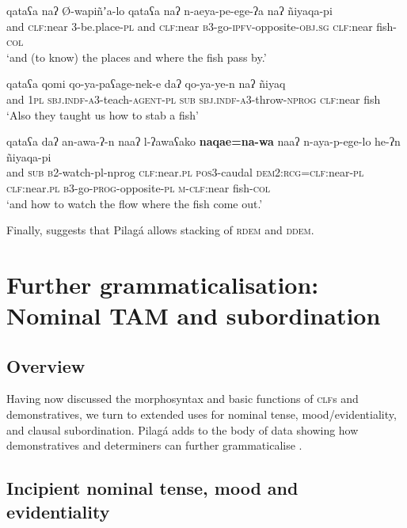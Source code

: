 \documentclass[output=paper,colorlinks,citecolor=brown]{langscibook}
\begin{document}
\ex\label{ex:payne:73b}
\gll qataʕa  naʔ  Ø-wapiñʼa-lo  qataʕa  naʔ n-aeya-pe-ege-ʔa  naʔ  ñiyaqa-pi\\
and \textsc{clf}:near \textsc{3}-be.place-\textsc{pl} and \textsc{clf}:near  \textsc{b3}-go-\textsc{ipfv}-opposite-\textsc{obj.sg}  \textsc{clf}:near fish-\textsc{col}\\
\glt ‘and (to know) the places and where the fish pass by.’

\ex\label{ex:payne:73c}
\gll qataʕa  qomi  qo-ya-paʕage-nek-e daʔ  qo-ya-ye-n  naʔ  ñiyaq\\
and  \textsc{1pl}  \textsc{sbj.indf-a3}-teach-\textsc{agent-pl} \textsc{sub}  \textsc{sbj.indf-a3}-throw-\textsc{nprog}  \textsc{clf}:near fish\\
\glt ‘Also they taught us how to stab a fish’

\ex\label{ex:payne:73d}
\gll qataʕa  daʔ  an-awa-ʔ-n  naaʔ  l-ʔawaʕako \textbf{naqae=na-wa}  naaʔ  n-aya-p-ege-lo he-ʔn  ñiyaqa-pi\\
and \textsc{sub}  \textsc{b2}-watch\textsc-{pl-nprog}  \textsc{clf}:near.\textsc{pl} \textsc{pos3}-caudal \textsc{dem2:rcg=clf}:near-\textsc{pl}  \textsc{clf}:near.\textsc{pl}  \textsc{b3}-go-\textsc{prog}-opposite-\textsc{pl} \textsc{m-clf}:near  fish-\textsc{col}\\
\glt ‘and how to watch the flow where the fish come out.’ 
\z
\z

Finally,  suggests that Pilagá allows stacking of \textsc{rdem} and \textsc{ddem}.

\section{Further grammaticalisation: Nominal TAM and subordination}\label{sec:payne:7}

\subsection{Overview}\label{sec:payne:7.1}

Having now discussed the morphosyntax and basic functions of \textsc{clf}s and demonstratives, we turn to extended uses for nominal tense, mood/evidentiality, and clausal subordination. Pilagá adds to the body of data showing how demonstratives and determiners can further grammaticalise \citep{Diessel1999Book,Diessel2003,Gildea1993,Aikhenvald2015}.

\subsection{Incipient nominal tense, mood and evidentiality}\label{sec:payne:7.2}
\end{document}
